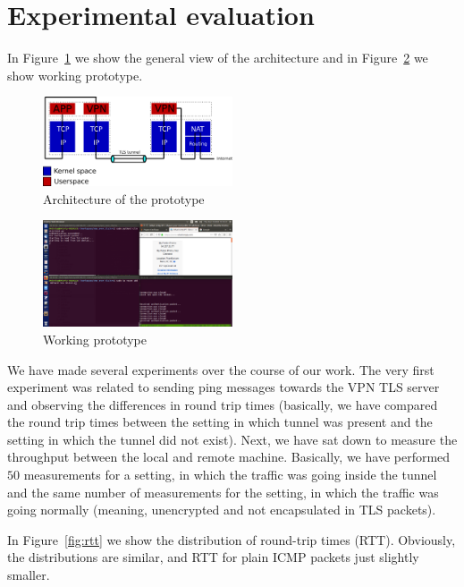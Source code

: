 \section{Experimental evaluation}
\label{section:experiments}



In Figure~\ref{fig:arch} we show the general view of the architecture and in 
Figure~\ref{fig:prototype} we show working prototype.

\begin{figure}[!h]
        \includegraphics[width=0.5\textwidth]{graphics/architecture.png}
        \caption{Architecture of the prototype}
        \label{fig:arch}
\end{figure}

\begin{figure}[!h]
        \includegraphics[width=0.5\textwidth]{graphics/vpn_over_tls_prototype.png}
        \caption{Working prototype}
        \label{fig:prototype}
\end{figure}

We have made several experiments over the course of our work. The very first experiment was 
related to sending ping messages towards the VPN TLS server and observing the differences in
round trip times (basically, we have compared the round trip times between the setting in 
which tunnel was present and the setting in which the tunnel did not exist). Next, we have
sat down to measure the throughput between the local and remote machine. Basically, we have 
performed $50$ measurements for a setting, in which the traffic was going inside the tunnel
and the same number of measurements for the setting, in which the traffic was going 
normally (meaning, unencrypted and not encapsulated in TLS packets).

In Figure~\ref{fig:rtt} we show the distribution of round-trip times
(RTT). Obviously, the distributions are similar, and RTT for
plain ICMP packets just slightly smaller.

